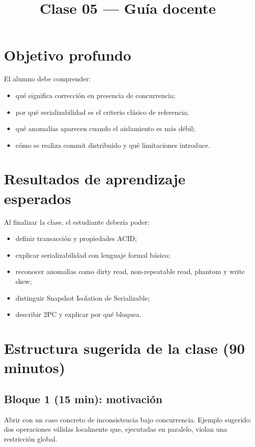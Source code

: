 \documentclass[variant=docente,cover=institutional,mode=screen]{ua-engineering-v6-article}
\title{Clase 05 --- Guía docente}
\author{\UAProfessor}
\date{\UADate}
\begin{document}
\maketitle

\section{Objetivo profundo}

El alumno debe comprender:

\begin{itemize}
\item qué significa corrección en presencia de concurrencia;
\item por qué serializabilidad es el criterio clásico de referencia;
\item qué anomalías aparecen cuando el aislamiento es más débil;
\item cómo se realiza commit distribuido y qué limitaciones introduce.
\end{itemize}

\section{Resultados de aprendizaje esperados}

Al finalizar la clase, el estudiante debería poder:

\begin{itemize}
\item definir transacción y propiedades ACID;
\item explicar serializabilidad con lenguaje formal básico;
\item reconocer anomalías como dirty read, non-repeatable read, phantom y write skew;
\item distinguir Snapshot Isolation de Serializable;
\item describir 2PC y explicar por qué bloquea.
\end{itemize}

\section{Estructura sugerida de la clase (90 minutos)}

\subsection*{Bloque 1 (15 min): motivación}

Abrir con un caso concreto de inconsistencia bajo concurrencia.  
Ejemplo sugerido: dos operaciones válidas localmente que, ejecutadas en paralelo, violan una restricción global.
\end{document}
